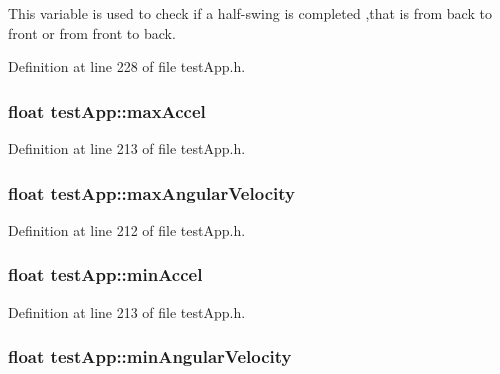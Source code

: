 This variable is used to check if a half-\/swing is completed ,that is from back to front or from front to back. 



Definition at line 228 of file test\-App.\-h.

\hypertarget{classtest_app_a34e834a5e4d359700147a74eece8eed1}{
\subsubsection[{max\-Accel}]{\setlength{\rightskip}{0pt plus 5cm}float test\-App\-::max\-Accel}}\label{classtest_app_a34e834a5e4d359700147a74eece8eed1}


Definition at line 213 of file test\-App.\-h.

\hypertarget{classtest_app_ab9565e8e6dc748ef68e6845f5f94cae9}{
\subsubsection[{max\-Angular\-Velocity}]{\setlength{\rightskip}{0pt plus 5cm}float test\-App\-::max\-Angular\-Velocity}}\label{classtest_app_ab9565e8e6dc748ef68e6845f5f94cae9}


Definition at line 212 of file test\-App.\-h.

\hypertarget{classtest_app_ab007edbc20b09d607f8010e2dbafdb97}{
\subsubsection[{min\-Accel}]{\setlength{\rightskip}{0pt plus 5cm}float test\-App\-::min\-Accel}}\label{classtest_app_ab007edbc20b09d607f8010e2dbafdb97}


Definition at line 213 of file test\-App.\-h.

\hypertarget{classtest_app_ac559756a01e0b98378bc29dfba9fac79}{
\subsubsection[{min\-Angular\-Velocity}]{\setlength{\rightskip}{0pt plus 5cm}float test\-App\-::min\-Angular\-Velocity}}\label{classtest_app_ac559756a01e0b98378bc29dfba9fac79}


